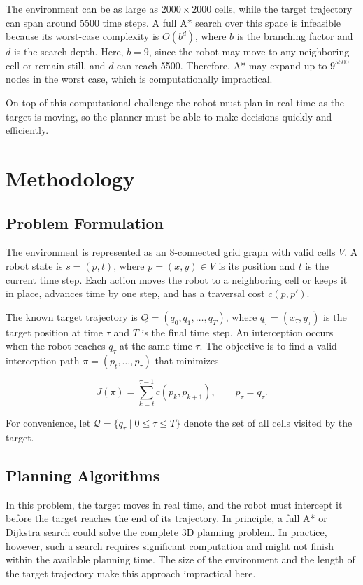\documentclass[11pt]{article}
\begin{document}
The environment can be as large as \(2000 \times 2000\) cells, while the target trajectory can span around 5500 time steps. A full A* search over this space is infeasible because its worst-case complexity is \(O(b^d)\), where \(b\) is the branching factor and \(d\) is the search depth. Here, \(b=9\), since the robot may move to any neighboring cell or remain still, and \(d\) can reach 5500. Therefore, A* may expand up to \(9^{5500}\) nodes in the worst case, which is computationally impractical.

On top of this computational challenge the robot must plan in real-time as the target is moving, so the planner must be able to make decisions quickly and efficiently.

\section{Methodology}
\subsection{Problem Formulation}
The environment is represented as an 8-connected grid graph with valid cells \(V\). A robot state is \(s=(p,t)\), where \(p=(x,y)\in V\) is its position and \(t\) is the current time step. Each action moves the robot to a neighboring cell or keeps it in place, advances time by one step, and has a traversal cost \(c(p,p')\).

The known target trajectory is \(Q=(q_0,q_1,\ldots,q_T)\), where \(q_\tau=(x_\tau,y_\tau)\) is the target position at time \(\tau\) and \(T\) is the final time step. An interception occurs when the robot reaches \(q_\tau\) at the same time \(\tau\). The objective is to find a valid interception path \(\pi=(p_t,\ldots,p_\tau)\) that minimizes

\[
  J(\pi)=\sum_{k=t}^{\tau-1}c(p_k,p_{k+1}),
  \qquad p_\tau=q_\tau.
\]

For convenience, let \(\mathcal{Q}=\{q_\tau\mid 0\leq\tau\leq T\}\) denote the set of all cells visited by the target.

\subsection{Planning Algorithms}
In this problem, the target moves in real time, and the robot must intercept it before the target reaches the end of its trajectory. In principle, a full A* or Dijkstra search could solve the complete 3D planning problem. In practice, however, such a search requires significant computation and might not finish within the available planning time. The size of the environment and the length of the target trajectory make this approach impractical here.
\end{document}
